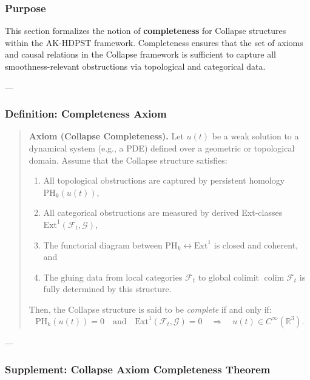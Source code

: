 \documentclass[11pt]{article}
\DeclareMathOperator{\colim}{colim}
\begin{document}
\begin{axiom}
\begin{axiom}
{{\subsubsection*{Purpose}

This section formalizes the notion of \textbf{completeness} for Collapse structures within the AK-HDPST framework.  
Completeness ensures that the set of axioms and causal relations in the Collapse framework is sufficient  
to capture all smoothness-relevant obstructions via topological and categorical data.

---

\subsubsection*{Definition: Completeness Axiom}

\begin{quote}
\textbf{Axiom (Collapse Completeness).}  
Let \( u(t) \) be a weak solution to a dynamical system (e.g., a PDE) defined over a geometric or topological domain.  
Assume that the Collapse structure satisfies:

\begin{enumerate}
  \item All topological obstructions are captured by persistent homology \(\mathrm{PH}_k(u(t))\),
  \item All categorical obstructions are measured by derived Ext-classes \(\mathrm{Ext}^1(\mathcal{F}_t, \mathcal{G})\),
  \item The functorial diagram between \(\mathrm{PH}_k \leftrightarrow \mathrm{Ext}^1\) is closed and coherent, and
  \item The gluing data from local categories \(\mathcal{F}_t\) to global colimit \(\colim \mathcal{F}_t\) is fully determined by this structure.
\end{enumerate}

Then, the Collapse structure is said to be \emph{complete} if and only if:
\[
\mathrm{PH}_k(u(t)) = 0 \quad \text{and} \quad \mathrm{Ext}^1(\mathcal{F}_t, \mathcal{G}) = 0 \quad \Longrightarrow \quad u(t) \in C^\infty(\mathbb{R}^3).
\]
\end{quote}

---

\subsubsection*{Supplement: Collapse Axiom Completeness Theorem}

}}
\end{axiom}
\end{axiom}
\end{document}
